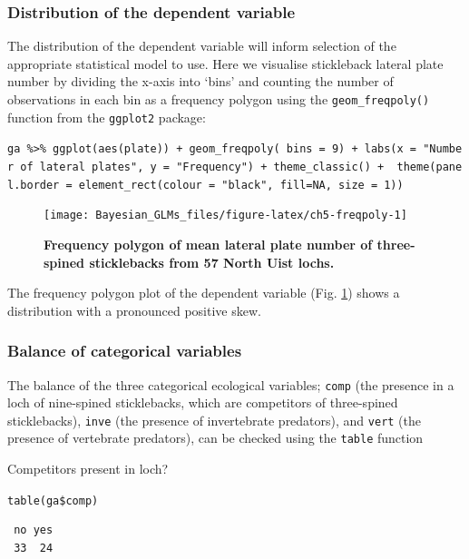\documentclass[
]{book}
\begin{document}
\hypertarget{pois-dist}{%
\subsubsection{Distribution of the dependent variable}\label{pois-dist}}

The distribution of the dependent variable will inform selection of the appropriate statistical model to use. Here we visualise stickleback lateral plate number by dividing the x-axis into `bins' and counting the number of observations in each bin as a frequency polygon using the \texttt{geom\_freqpoly()} function from the \texttt{ggplot2} package:

\texttt{ga\ \%\textgreater{}\%\ ggplot(aes(plate))\ +\ geom\_freqpoly(\ bins\ =\ 9)\ +\ labs(x\ =\ "Number\ of\ lateral\ plates",\ y\ =\ "Frequency")\ +\ theme\_classic()\ +\ \ theme(panel.border\ =\ element\_rect(colour\ =\ "black",\ fill=NA,\ size\ =\ 1))}



\begin{figure}

{\centering \texttt{[image: Bayesian\_GLMs\_files/figure-latex/ch5-freqpoly-1]} 

}

\caption{\textbf{Frequency polygon of mean lateral plate number of three-spined sticklebacks from 57 North Uist lochs.}}\label{fig:ch5-freqpoly}
\end{figure}

The frequency polygon plot of the dependent variable (Fig. \ref{fig:ch5-freqpoly}) shows a distribution with a pronounced positive skew.

\hypertarget{pois-balance}{%
\subsubsection{Balance of categorical variables}\label{pois-balance}}

The balance of the three categorical ecological variables; \texttt{comp} (the presence in a loch of nine-spined sticklebacks, which are competitors of three-spined sticklebacks), \texttt{inve} (the presence of invertebrate predators), and \texttt{vert} (the presence of vertebrate predators), can be checked using the \texttt{table} function

Competitors present in loch?

\texttt{table(ga\$comp)}

\begin{verbatim}
 no yes 
 33  24 
\end{verbatim}
\end{document}
